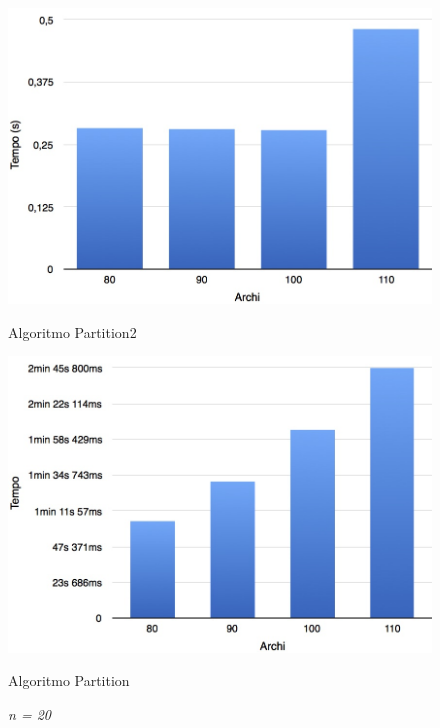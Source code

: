 \begin{figure}[h!]
	\vspace*{1cm}
	\begin{minipage}{0.40\textwidth}
		\centering
		\includegraphics[scale=.25]{img/beta4/20_4.jpg}
		\caption{Algoritmo Partition2}
	\end{minipage}\hfill
	\begin{minipage}{0.40\textwidth}
		\centering
		\includegraphics[scale=.25]{img/iole_beta4/iole_20_4.jpg}
		\caption{Algoritmo Partition}
	\end{minipage}
	\caption*{\textit{n = 20}}
\end{figure}
